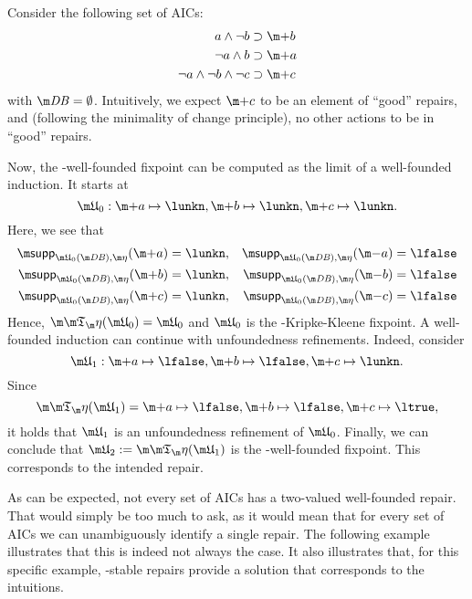 \begin{example}
 Consider the following set \aics of AICs:
\begin{align*}
 a \land \lnot b&\aicrule \add b \\
 \lnot a \land b &\aicrule \add a \\
 \lnot a \land \lnot b \land \lnot c &\aicrule \add c
 \end{align*} with $\db = \emptyset$. Intuitively, we expect $\add c$ to be an element of ``good'' repairs, and (following the minimality of change principle), no other actions to be in ``good'' repairs. 

Now, the \Ap-well-founded fixpoint can be computed as the limit of a well-founded induction. It starts at
\[\UUU_0: \add a\mapsto \lunkn, \add b\mapsto \lunkn, \add c\mapsto\lunkn.\]
Here, we see that 
\begin{align*}
 \supp_{\UUU_0(\db),\aics}(\add a) &= \lunkn, & \supp_{\UUU_0(\db),\aics}(\remove a) &=\lfalse \\
 \supp_{\UUU_0(\db),\aics}(\add b) &= \lunkn, & \supp_{\UUU_0(\db),\aics}(\remove b) &=\lfalse \\
 \supp_{\UUU_0(\db),\aics}(\add c) &= \lunkn, & \supp_{\UUU_0(\db),\aics}(\remove c) &=\lfalse 
\end{align*}
Hence, $\Ap(\UUU_0)=\UUU_0$ and $\UUU_0$ is the \Ap-Kripke-Kleene fixpoint. 
A well-founded induction can continue with unfoundedness refinements. Indeed, consider 
\[\UUU_1: \add a\mapsto \lfalse, \add b\mapsto \lfalse, \add c\mapsto\lunkn.\]
Since 
\[\Ap(\UUU_1) = \add a\mapsto \lfalse, \add b\mapsto \lfalse, \add c\mapsto \ltrue,\] it holds that $\UUU_1$ is an unfoundedness refinement of $\UUU_0$. 
Finally, we can conclude that $\UUU_2:=\Ap(\UUU_1)$ is the \Ap-well-founded fixpoint. This corresponds to the intended repair.
\end{example}

As can be expected, not every set of AICs has a two-valued well-founded repair. That would simply be too much to ask, as it would mean that for every set of AICs we can unambiguously identify a single repair. The following example illustrates that this is indeed not always the case. It also illustrates that, for this specific example, \Ap-stable repairs provide a solution that corresponds to the intuitions. 

